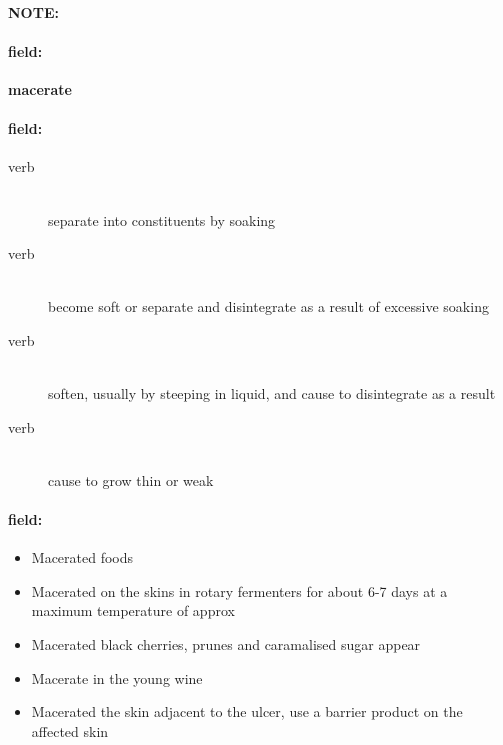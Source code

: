 \documentclass[12pt]{article}
\newenvironment{note}{\paragraph{NOTE:}}{}
\newenvironment{field}{\paragraph{field:}}{}
\begin{document}
\begin{note}
\begin{field}
\textbf{\large macerate}
\end{field}


\begin{field}
\begin{description}
\item[verb] \hfill \\ 
separate into constituents by soaking

\item[verb] \hfill \\ 
become soft or separate and disintegrate as a result of excessive soaking

\item[verb] \hfill \\ 
soften, usually by steeping in liquid, and cause to disintegrate as a result

\item[verb] \hfill \\ 
cause to grow thin or weak

\end{description}
\end{field}

\begin{field}
\begin{itemize}
\item Macerated foods
\item Macerated on the skins in rotary fermenters for about 6-7 days at a maximum temperature of approx
\item Macerated black cherries, prunes and caramalised sugar appear
\item Macerate in the young wine
\item Macerated the skin adjacent to the ulcer, use a barrier product on the affected skin
\end{itemize}
\end{field}
\end{note}
\end{document}
